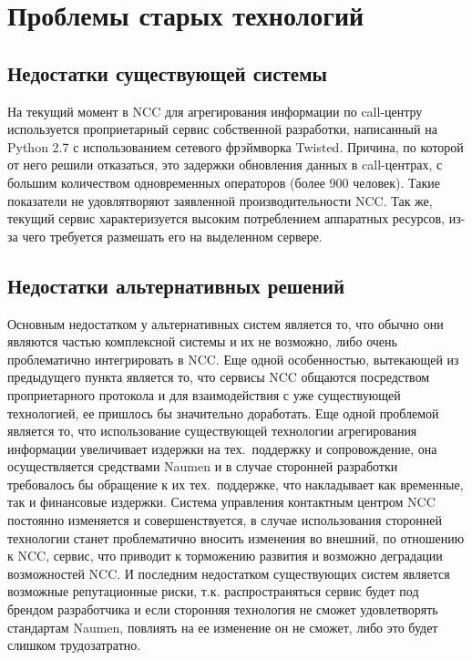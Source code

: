 \section{Проблемы старых технологий}

\subsection{Недостатки существующей системы}

На текущий момент в NCC для агрегирования информации по call-центру используется проприетарный сервис
собственной разработки, написанный на Python 2.7 с использованием сетевого фрэймворка Twisted.
Причина, по которой от него решили отказаться, это задержки обновления данных в call-центрах,
с большим количеством одновременных операторов (более 900 человек).
Такие показатели не удовлятворяют заявленной производительности NCC\@.
Так же, текущий сервис характеризуется высоким потреблением аппаратных ресурсов,
из-за чего требуется размешать его на выделенном сервере.

\subsection{Недостатки альтернативных решений}

Основным недостатком у альтернативных систем является то,
что обычно они являются частью комплексной системы и их не возможно,
либо очень проблематично интегрировать в NCC\@.
Еще одной особенностью, вытекающей из предыдущего пункта является то,
что сервисы NCC общаются посредством проприетарного протокола и для взаимодействия
с уже существующей технологией, ее пришлось бы значительно доработать.
Еще одной проблемой является то, что использование существующей технологии агрегирования информации
увеличивает издержки на тех.~поддержку и сопровождение,
она осуществляется средствами Naumen и в случае сторонней разработки требовалось бы обращение
к их тех.~поддержке, что накладывает как временные, так и финансовые издержки.
Система управления контактным центром NCC постоянно изменяется и совершенствуется,
в случае использования сторонней технологии станет проблематично вносить изменения во внешний,
по отношению к NCC, сервис, что приводит к торможению развития и возможно деградации возможностей NCC.
И последним недостатком существующих систем является возможные репутационные риски,
т.к. распространяться сервис будет под брендом разработчика
и если сторонняя технология не сможет удовлетворять стандартам Naumen,
повлиять на ее изменение он не сможет, либо это будет слишком трудозатратно.

